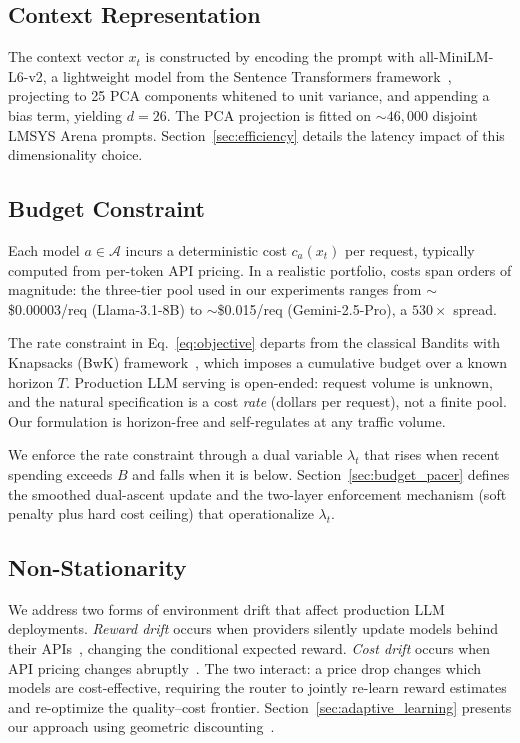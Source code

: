 \subsection{Context Representation}
\label{sec:context_repr}

The context vector $x_t$ is constructed by encoding the prompt with all-MiniLM-L6-v2, a lightweight model from the Sentence Transformers framework~\cite{reimers2019sentence}, projecting to 25 PCA components whitened to unit variance, and appending a bias term, yielding $d = 26$. The PCA projection is fitted on ${\sim}46{,}000$ disjoint LMSYS Arena prompts. Section~\ref{sec:efficiency} details the latency impact of this dimensionality choice.

\subsection{Budget Constraint}
\label{sec:budget_constraint}

Each model $a \in \mathcal{A}$ incurs a deterministic cost $c_a(x_t)$ per request, typically computed from per-token API pricing. In a realistic portfolio, costs span orders of magnitude: the three-tier pool used in our experiments ranges from ${\sim}$\$0.00003/req (Llama-3.1-8B) to ${\sim}$\$0.015/req (Gemini-2.5-Pro), a $530{\times}$ spread.

The rate constraint in Eq.~\ref{eq:objective} departs from the classical Bandits with Knapsacks (BwK) framework~\cite{badanidiyuru2013bwk}, which imposes a cumulative budget over a known horizon $T$. Production LLM serving is open-ended: request volume is unknown, and the natural specification is a cost \emph{rate} (dollars per request), not a finite pool. Our formulation is horizon-free and self-regulates at any traffic volume.

We enforce the rate constraint through a dual variable $\lambda_t$ that rises when recent spending exceeds $B$ and falls when it is below. Section~\ref{sec:budget_pacer} defines the smoothed dual-ascent update and the two-layer enforcement mechanism (soft penalty plus hard cost ceiling) that operationalize $\lambda_t$.

\subsection{Non-Stationarity}
\label{sec:nonstationarity}

We address two forms of environment drift that affect production LLM deployments. \emph{Reward drift} occurs when providers silently update models behind their APIs~\cite{chen2023chatgptdrift, ma2024prompt}, changing the conditional expected reward. \emph{Cost drift} occurs when API pricing changes abruptly~\cite{openai2024gpt4opricing}. The two interact: a price drop changes which models are cost-effective, requiring the router to jointly re-learn reward estimates and re-optimize the quality--cost frontier. Section~\ref{sec:adaptive_learning} presents our approach using geometric discounting~\cite{garivier2011switching, russac2019weighted}.
